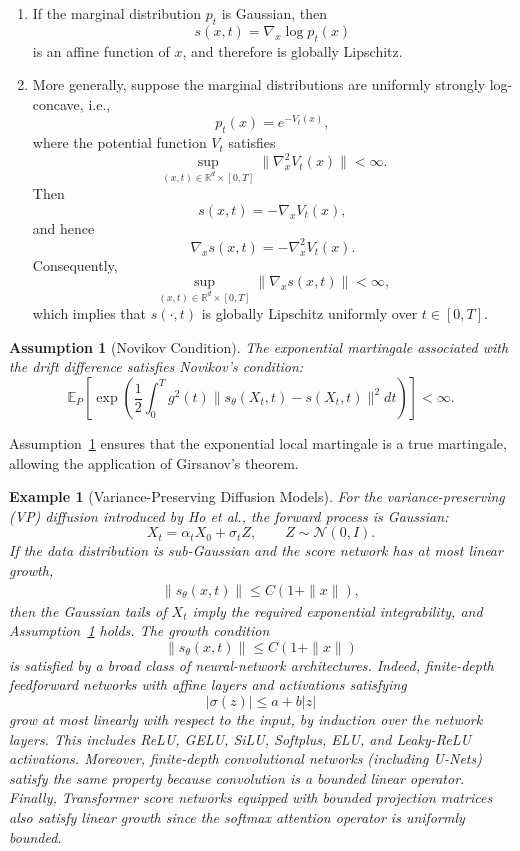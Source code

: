 \documentclass[11pt]{article}
\newtheorem{assumption}{Assumption}
\newtheorem{example}{Example}
\begin{document}
\begin{enumerate}
\item
If the marginal distribution $p_t$ is Gaussian, then
\[
s(x,t)=\nabla_x\log p_t(x)
\]
is an affine function of $x$, and therefore is globally Lipschitz.

\item
More generally, suppose the marginal distributions are uniformly strongly
log-concave, i.e.,
\[
p_t(x)=e^{-V_t(x)},
\]
where the potential function $V_t$ satisfies
\[
\sup_{(x,t)\in\mathbb R^d\times[0,T]}
\|\nabla_x^2V_t(x)\|
<\infty.
\]
Then
\[
s(x,t)
=
-\nabla_xV_t(x),
\]
and hence
\[
\nabla_x s(x,t)
=
-\nabla_x^2V_t(x).
\]
Consequently,
\[
\sup_{(x,t)\in\mathbb R^d\times[0,T]}
\|\nabla_x s(x,t)\|
<
\infty,
\]
which implies that $s(\cdot,t)$ is globally Lipschitz uniformly over
$t\in[0,T]$.
\end{enumerate}



\vspace{2mm}

\begin{assumption}[Novikov Condition]
\label{ass:novikov}
The exponential martingale associated with the drift difference satisfies
Novikov's condition:
\[
\mathbb E_P
\left[
\exp
\left(
\frac12
\int_0^T
g^2(t)
\|s_\theta(X_t,t)-s(X_t,t)\|^2dt
\right)
\right]
<
\infty.
\]
\end{assumption}

Assumption~\ref{ass:novikov} ensures that the exponential local martingale is
a true martingale, allowing the application of Girsanov's theorem.

\begin{example}[Variance-Preserving Diffusion Models]
For the variance-preserving (VP) diffusion introduced by Ho et al.,
the forward process is Gaussian:
\[
X_t=\alpha_tX_0+\sigma_tZ,
\qquad
Z\sim\mathcal N(0,I).
\]
If the data distribution is sub-Gaussian and the score network has at most
linear growth,
\begin{align}
\|s_\theta(x,t)\|
\le
C(1+\|x\|) \label{Kcond},
\end{align}
then the Gaussian tails of $X_t$ imply the required exponential
integrability, and Assumption~\ref{ass:novikov} holds. The growth condition
\[
\|s_\theta(x,t)\|
\le
C(1+\|x\|)
\]
is satisfied by a broad class of neural-network architectures.
Indeed, finite-depth feedforward networks with affine layers and
activations satisfying
\[
|\sigma(z)|\le a+b|z|
\]
grow at most linearly with respect to the input, by induction over the
network layers.
This includes ReLU, GELU, SiLU, Softplus, ELU, and Leaky-ReLU
activations.
Moreover, finite-depth convolutional networks (including U-Nets) satisfy
the same property because convolution is a bounded linear operator.
Finally, Transformer score networks equipped with bounded projection
matrices also satisfy linear growth since the softmax attention operator
is uniformly bounded.
\end{example}
\end{document}

